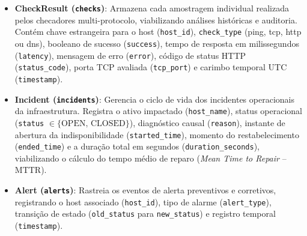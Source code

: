 \documentclass[12pt,a4paper]{article}
\begin{document}
\begin{itemize}[leftmargin=1.25cm]
\begin{itemize}
  \item \textit{Métricas Estatísticas e Ciclo de Vida}: SLA móvel das últimas 50 amostras (\texttt{sla\_rolling\_ping}, \texttt{sla\_rolling\_tcp}, \texttt{sla\_rolling\_http}), variação de latência em milissegundos (\texttt{jitter\_ms\_ping}, \texttt{jitter\_ms\_tcp}, \texttt{jitter\_ms\_http}), coeficiente angular de regressão (\texttt{slope}, \texttt{slope\_http}), tendência qualitativa (\texttt{trend} e \texttt{trend\_http} $\in \{\text{STABLE, DEGRADING, IMPROVING}\}$), controle de exclusão lógica (\texttt{deleted\_at}, permitindo recuperação na lixeira) e estado de aferição de linha de base (\texttt{baseline\_pending}).
  \item \textit{Desacoplamento e Métodos}: Sob as diretrizes de \textit{Clean Architecture}, os algoritmos estatísticos de cálculo de disponibilidade (\texttt{calculate\_sla()}), oscilação de latência (\texttt{calculate\_jitter()}), vazão de banda (\texttt{calculate\_bandwidth\_delta()}) e consolidação sintética (\texttt{compute\_health\_score()}) foram desacoplados do modelo ORM, residindo como serviços analíticos puros no módulo \texttt{Backend/metrics.py}. A entidade \texttt{Host} preserva o estado relacional e o ciclo de vida de persistência (\textit{soft delete} e restauração via carimbo em \texttt{deleted\_at}).
  \end{itemize}
\item \textbf{CheckResult (\texttt{checks})}: Armazena cada amostragem individual realizada pelos checadores multi-protocolo, viabilizando análises históricas e auditoria. Contém chave estrangeira para o host (\texttt{host\_id}), \texttt{check\_type} (ping, tcp, http ou dns), booleano de sucesso (\texttt{success}), tempo de resposta em milissegundos (\texttt{latency}), mensagem de erro (\texttt{error}), código de status HTTP (\texttt{status\_code}), porta TCP avaliada (\texttt{tcp\_port}) e carimbo temporal UTC (\texttt{timestamp}).
\item \textbf{Incident (\texttt{incidents})}: Gerencia o ciclo de vida dos incidentes operacionais da infraestrutura. Registra o ativo impactado (\texttt{host\_name}), status operacional (\texttt{status} $\in \{\text{OPEN, CLOSED}\}$), diagnóstico causal (\texttt{reason}), instante de abertura da indisponibilidade (\texttt{started\_time}), momento do restabelecimento (\texttt{ended\_time}) e a duração total em segundos (\texttt{duration\_seconds}), viabilizando o cálculo do tempo médio de reparo (\textit{Mean Time to Repair} -- MTTR).
\item \textbf{Alert (\texttt{alerts})}: Rastreia os eventos de alerta preventivos e corretivos, registrando o host associado (\texttt{host\_id}), tipo de alarme (\texttt{alert\_type}), transição de estado (\texttt{old\_status} para \texttt{new\_status}) e registro temporal (\texttt{timestamp}).

\end{itemize}
\end{document}
